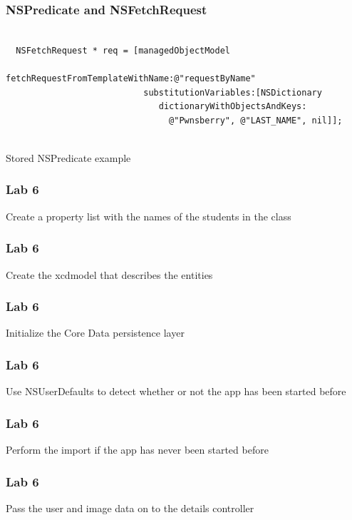 \documentclass[10pt]{beamer}
\begin{document}
\begin{frame}[fragile]
  \frametitle{NSPredicate and NSFetchRequest}
  \begin{listing}[H]
    \begin{verbatim}
  
  NSFetchRequest * req = [managedObjectModel
                           fetchRequestFromTemplateWithName:@"requestByName"
                           substitutionVariables:[NSDictionary
                              dictionaryWithObjectsAndKeys:
                                @"Pwnsberry", @"LAST_NAME", nil]];
                
  \end{verbatim}
    \caption{Stored NSPredicate example}
    \label{listing:42}
  \end{listing}

\end{frame}

    
\begin{frame}[fragile]
  \frametitle{Lab 6}
  Create a property list with the names of the students in the class

\end{frame}

\begin{frame}[fragile]
  \frametitle{Lab 6}
  Create the xcdmodel that describes the entities

\end{frame}

\begin{frame}[fragile]
  \frametitle{Lab 6}
  Initialize the Core Data persistence layer

\end{frame}

\begin{frame}[fragile]
  \frametitle{Lab 6}
  Use NSUserDefaults to detect whether or not the app has been started before

\end{frame}

\begin{frame}[fragile]
  \frametitle{Lab 6}
  Perform the import if the app has never been started before

\end{frame}

\begin{frame}[fragile]
  \frametitle{Lab 6}
  Pass the user and image data on to the details controller

\end{frame}
\end{document}

